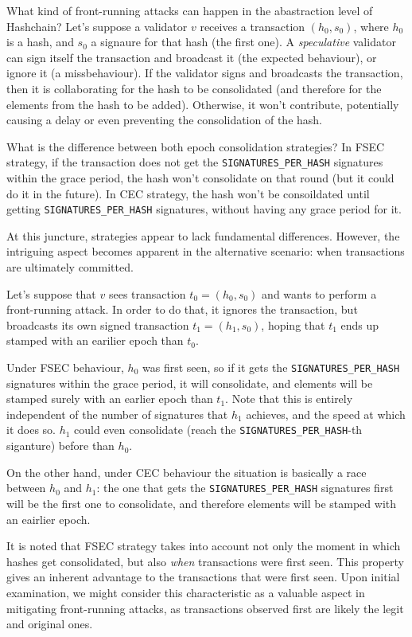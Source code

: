 What kind of front-running attacks can happen in the abastraction level of Hashchain?
Let's suppose a validator $v$ receives a transaction $(h_0, s_0)$, where $h_0$ is a hash,
and $s_0$ a signaure for that hash (the first one). A \textit{speculative} validator can
sign itself the
transaction and broadcast it (the expected behaviour), or
ignore it (a missbehaviour). If the validator signs and broadcasts the transaction,
then it is collaborating for the hash to be consolidated (and therefore for the elements
from the hash to be added).
Otherwise, it won't contribute, potentially causing a delay or even preventing the
consolidation of the hash.

What is the difference between both epoch consolidation strategies?
In FSEC strategy, if the transaction does not get the \texttt{SIGNATURES\_PER\_HASH}
signatures within the grace period, the hash won't consolidate on that round (but it could
do it in the future).
In CEC strategy, the hash won't be consoildated until getting
\texttt{SIGNATURES\_PER\_HASH} signatures, without having any grace period for it.

At this juncture, strategies appear to lack fundamental differences. However, the
intriguing aspect becomes apparent in the alternative scenario: when transactions are
ultimately committed.

Let's suppose that $v$ sees transaction $t_0 = (h_0, s_0)$ and wants to perform a front-running
attack. In order to do that, it ignores the transaction, but broadcasts its own signed
transaction $t_1 = (h_1, s_0)$, hoping that $t_1$ ends up stamped with an earilier epoch than $t_0$.

Under FSEC behaviour, $h_0$ was first seen, so if it gets the \texttt{SIGNATURES\_PER\_HASH}
signatures within the grace period, it will consolidate, and elements will be stamped surely with an earlier
epoch than $t_1$.
Note that this is entirely independent of the number of signatures that $h_1$ achieves, and the
speed at which it does so. $h_1$ could even consolidate (reach the \texttt{SIGNATURES\_PER\_HASH}-th
siganture) before than $h_0$.

On the other hand, under CEC behaviour the situation is basically a race between
$h_0$ and $h_1$: the one that gets the \texttt{SIGNATURES\_PER\_HASH} signatures first will
be the first one to consolidate, and therefore elements will be stamped with an eairlier epoch.

It is noted that FSEC strategy takes into account
not only the
moment in which hashes get consolidated, but also \textit{when} transactions were first seen.
This property gives an inherent advantage to the transactions that were first seen.
Upon initial examination, we might consider this characteristic as a valuable aspect in
mitigating front-running attacks, as transactions observed first are likely the legit
and original ones.

